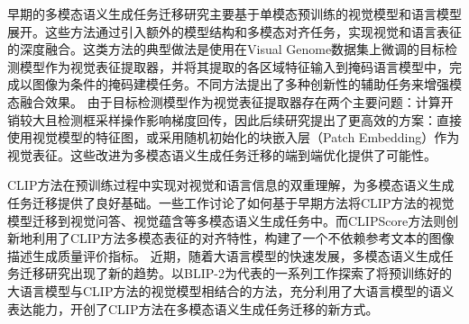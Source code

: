 早期的多模态语义生成任务迁移研究\cite{visualbert, vl-bert, uniter, OSCAR, VinVL, LEMON}主要基于单模态预训练的视觉模型和语言模型展开。这些方法通过引入额外的模型结构和多模态对齐任务，实现视觉和语言表征的深度融合。这类方法的典型做法是使用在Visual Genome数据集上微调的目标检测模型\cite{butd}作为视觉表征提取器，并将其提取的各区域特征输入到掩码语言模型中，完成以图像为条件的掩码建模任务。不同方法提出了多种创新性的辅助任务来增强模态融合效果。
由于目标检测模型作为视觉表征提取器存在两个主要问题：计算开销较大且检测框采样操作影响梯度回传，因此后续研究\cite{pixelbert, soho, vilt}提出了更高效的方案：直接使用视觉模型的特征图，或采用随机初始化的块嵌入层（Patch Embedding）作为视觉表征。这些改进为多模态语义生成任务迁移的端到端优化提供了可能性。

CLIP方法在预训练过程中实现对视觉和语言信息的双重理解，为多模态语义生成任务迁移提供了良好基础。一些工作\cite{song-etal-2022-clip, shen2022how}讨论了如何基于早期方法\cite{pixelbert}将CLIP方法的视觉模型迁移到视觉问答、视觉蕴含等多模态语义生成任务中。而CLIPScore方法\cite{CLIPScore}则创新地利用了CLIP方法多模态表征的对齐特性，构建了一个不依赖参考文本的图像描述生成质量评价指标。
近期，随着大语言模型的快速发展，多模态语义生成任务迁移研究出现了新的趋势。以BLIP-2\cite{blip-2}为代表的一系列工作\cite{minigpt4,llava,llavanextinterleave}探索了将预训练好的大语言模型与CLIP方法的视觉模型相结合的方法，充分利用了大语言模型的语义表达能力，开创了CLIP方法在多模态语义生成任务迁移的新方式。


